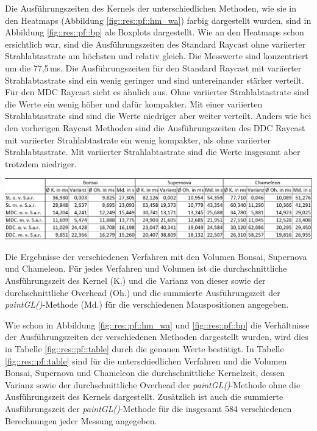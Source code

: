 Die Ausführungszeiten des Kernels der unterschiedlichen Methoden, wie sie in den Heatmaps (Abbildung \ref{fig::res::pf::hm_wa}) farbig dargestellt wurden, sind in Abbildung \ref{fig::res::pf::bp} als Boxplots dargestellt.
Wie an den Heatmaps schon ersichtlich war, sind die Ausführungszeiten des Standard Raycast ohne variierter Strahlabtastrate am höchsten und relativ gleich.
Die Messwerte sind konzentriert um die 77,5\,ms.
Die Ausführungszeiten für den Standard Raycast mit variierter Strahlabtastrate sind ein wenig geringer und sind untereinander stärker verteilt.
Für den MDC Raycast sieht es ähnlich aus.
Ohne variierter Strahlabtastrate sind die Werte ein wenig höher und dafür kompakter.
Mit einer variierten Strahlabtastrate sind sind die Werte niedriger aber weiter verteilt.
Anders wie bei den vorherigen Raycast Methoden sind die Ausführungszeiten des DDC Raycast mit variierter Strahlabtastrate ein wenig kompakter, als ohne variierter Strahlabtastrate.
Mit variierter Strahlabtastrate sind die Werte insgesamt aber trotzdem niedriger.

\begin{table}
	\centering
	\includegraphics[width=1\textwidth]{../../Neue_Messungen/Messungen_in_Tabelle.PNG}
	\caption{Die Ergebnisse der verschiedenen Verfahren mit den Volumen Bonsai, Supernova und Chameleon. Für jedes Verfahren und Volumen ist die durchschnittliche Ausführungszeit des Kernel (K.) und die Varianz von dieser sowie der durchschnittliche Overhead (Oh.) und die summierte Ausführungszeit der \emph{paintGL()}-Methode (Md.) für die verschiedenen Mauspositionen angegeben.}
	\label{fig::res::pf::table}
\end{table}

Wie schon in Abbildung \ref{fig::res::pf::hm_wa} und \ref{fig::res::pf::bp} die Verhältnisse der Ausführungszeiten der verschiedenen Methoden dargestellt wurden, wird dies in Tabelle \ref{fig::res::pf::table} durch die genauen Werte bestätigt.
In Tabelle \ref{fig::res::pf::table} sind für die unterschiedlichen Verfahren und die Volumen Bonsai, Supernova und Chameleon die durchschnittliche Kernelzeit, dessen Varianz sowie der durchschnittliche Overhead der \emph{paintGL()}-Methode ohne die Ausführungszeit des Kernels dargestellt.
Zusätzlich ist auch die summierte Ausführungszeit der \emph{paintGL()}-Methode für die insgesamt 584 verschiedenen Berechnungen jeder Messung angegeben.

